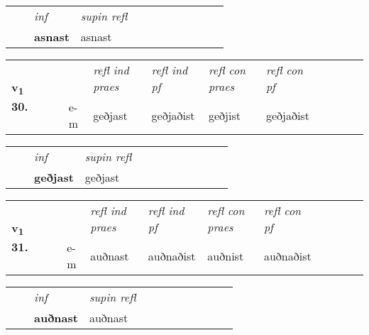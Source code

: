 \begin{tabular}{llllllllllll}
 & & \textit{inf}       & \textit{supin refl}      \\*
  & & \textbf{asnast}        & asnast  \\*
\cmidrule{1-12}
\end{tabular}





\begin{tabular}{llllllllllll}\toprule
\multirow{4}{*}{{{\textbf{v{\textsubscript{1}}} \Large{\textbf{30.}}}}}  & &  & &  \textit{refl ind praes} & \textit{refl ind pf} & \textit{refl con praes} & \textit{refl con pf} \\*
&  & & e-m & geðjast & geðjaðist & geðjist & geðjaðist \\*
\cmidrule{5-9}
\end{tabular}


\begin{tabular}{llllllllllll}
 & & \textit{inf}       & \textit{supin refl}      \\*
  & & \textbf{geðjast}        & geðjast  \\*
\cmidrule{1-12}
\end{tabular}





\begin{tabular}{llllllllllll}\toprule
\multirow{4}{*}{{{\textbf{v{\textsubscript{1}}} \Large{\textbf{31.}}}}}  & &  & &  \textit{refl ind praes} & \textit{refl ind pf} & \textit{refl con praes} & \textit{refl con pf} \\*
&  & & e-m & auðnast & auðnaðist & auðnist & auðnaðist \\*
\cmidrule{5-9}
\end{tabular}


\begin{tabular}{llllllllllll}
 & & \textit{inf}       & \textit{supin refl}      \\*
  & & \textbf{auðnast}        & auðnast  \\*
\cmidrule{1-12}
\end{tabular}



